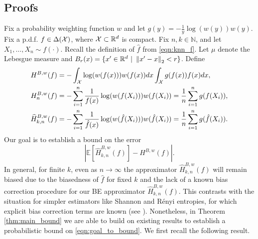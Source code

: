 \subsection{Proofs}

Fix a probability weighting function $w$ and let $g(y) = -\frac{1}{y} \log(w(y)) w(y)$. Fix a p.d.f. $f \in \Delta(\mathcal{X})$, where $\mathcal{X} \subset \mathbb{R}^d$ is compact. Fix $n, k \in \mathbb{N}$, and let $X_1, \ldots, X_n \sim f(\cdot)$. Recall the definition of $\hat{f}$ from \eqref{eqn:knn_f}. Let $\mu$ denote the Lebesgue measure and $B_r(x) = \{ x' \in \mathbb{R}^d \ | \ \left\lVert x' - x\right\rVert_2 < r \}$. Define
%
\begin{align}
    H^{B,w}(f) &= - \int_{\mathcal{X}} \log(w(f(x))) w(f(x)) dx \int_{\mathcal{X}} g(f(x)) f(x) dx, \\
    H^{B,w}_n(f) &= - \sum_{i=1}^n \frac{1}{f(x)} \log(w(f(X_i))) w(f(X_i)) = \frac{1}{n} \sum_{i=1}^n g(f(X_i)), \\
    \widehat{H}^{B,w}_{k,n}(f) &= - \sum_{i=1}^n \frac{1}{\hat{f}(x)} \log(w(\hat{f}(X_i))) w(\hat{f}(X_i)) = \frac{1}{n} \sum_{i=1}^n g(\hat{f}(X_i)).
\end{align}
%
Our goal is to establish a bound on the error
%
\begin{equation} \label{eqn:goal_to_bound}
    \left| \mathbb{E} \left[ \widehat{H}^{B,w}_{k,n}(f) \right] - H^{B,w}(f) \right|.
\end{equation}
%
In general, for finite $k$, even as $n \rightarrow \infty$ the approximator $\widehat{H}^{B,w}_{k,n}(f)$ will remain biased due to the biasedness of $\hat{f}$ for fixed $k$ and the lack of a known bias correction procedure for our BE approximator $\widehat{H}^{B,w}_{k,n}(f)$. This contrasts with the situation for simpler estimators like Shannon and R\'{e}nyi entropies, for which explicit bias correction terms are known (see \cite{singh2003nearest, leonenko2008class, singh2016finite}). Nonetheless, in Theorem \ref{thm:main_bound} we are able to build on existing results to establish a probabilistic bound on \eqref{eqn:goal_to_bound}. We first recall the following result.
%
